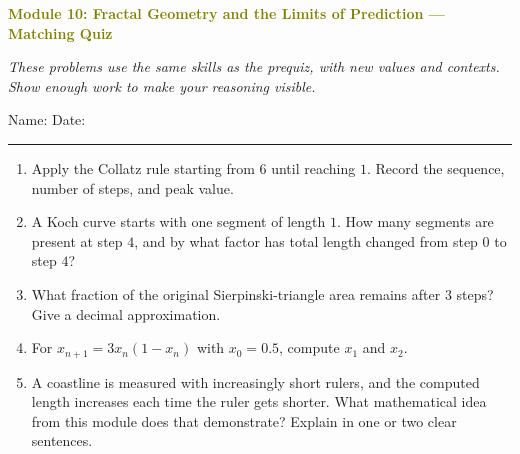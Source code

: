 \documentclass[11pt]{article}
\newcommand{\quizhead}[2]{%
  \clearpage
  {\Large\bfseries\textcolor{olive}{Module #1: #2 — Matching Quiz}}\par
  \textit{These problems use the same skills as the prequiz, with new values and contexts. Show enough work to make your reasoning visible.}\par
  Name: \hspace{2.6in} Date: \hspace{1.1in}\par
  \vspace{2pt}\textcolor{gold}{\rule{\linewidth}{1.2pt}}\par\smallskip
}
\newcommand{\workmed}{\par\vspace{0.62in}}
\newcommand{\worklarge}{\par\vspace{0.92in}}
\begin{document}
\quizhead{10}{Fractal Geometry and the Limits of Prediction}
\begin{enumerate}
\item Apply the Collatz rule starting from \(6\) until reaching \(1\). Record the sequence, number of steps, and peak value.
\worklarge

\item A Koch curve starts with one segment of length \(1\). How many segments are present at step \(4\), and by what factor has total length changed from step \(0\) to step \(4\)?
\worklarge

\item What fraction of the original Sierpinski-triangle area remains after \(3\) steps? Give a decimal approximation.
\workmed

\item For \(x_{n+1}=3x_n(1-x_n)\) with \(x_0=0.5\), compute \(x_1\) and \(x_2\).
\worklarge

\item A coastline is measured with increasingly short rulers, and the computed length increases each time the ruler gets shorter. What mathematical idea from this module does that demonstrate? Explain in one or two clear sentences.
\workmed
\end{enumerate}
\end{document}
